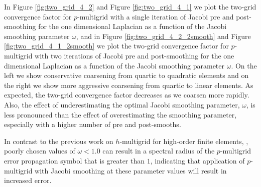 In Figure \ref{fig:two_grid_4_2} and Figure \ref{fig:two_grid_4_1} we plot the two-grid convergence factor for $p$-multigrid with a single iteration of Jacobi pre and post-smoothing for the one dimensional Laplacian as a function of the Jacobi smoothing parameter $\omega$,
and in Figure \ref{fig:two_grid_4_2_2smooth} and Figure \ref{fig:two_grid_4_1_2smooth} we plot the two-grid convergence factor for $p$-multigrid with two iterations of Jacobi pre and post-smoothing for the one dimensional Laplacian as a function of the Jacobi smoothing parameter $\omega$.
On the left we show conservative coarsening from quartic to quadratic elements and on the right we show more aggressive coarsening from quartic to linear elements.
As expected, the two-grid convergence factor decreases as we coarsen more rapidly.
Also, the effect of underestimating the optimal Jacobi smoothing parameter, $\omega$, is less pronounced than the effect of overestimating the smoothing parameter, especially with a higher number of pre and post-smooths.

In contrast to the previous work on $h$-multigrid for high-order finite elements, \cite{he2020two}, poorly chosen values of $\omega < 1.0$ can result in a spectral radius of the $p$-multigrid error propagation symbol that is greater than $1$, indicating that application of $p$-multigrid with Jacobi smoothing at these parameter values will result in increased error.


